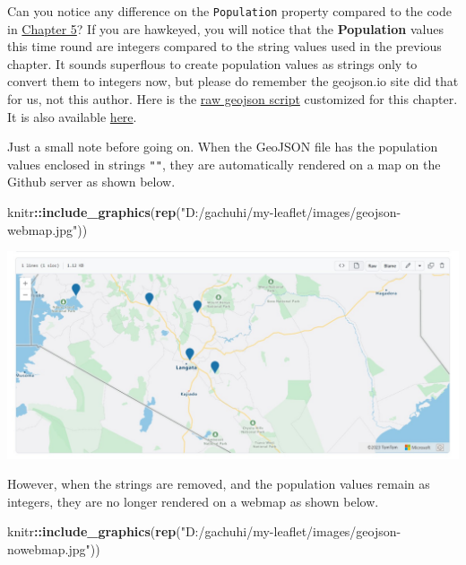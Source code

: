 \documentclass[
]{book}
\newenvironment{Shaded}{\begin{snugshade}}{\end{snugshade}}
\newcommand{\FunctionTok}[1]{\textcolor[rgb]{0.13,0.29,0.53}{\textbf{#1}}}
\newcommand{\NormalTok}[1]{#1}
\newcommand{\SpecialCharTok}[1]{\textcolor[rgb]{0.81,0.36,0.00}{\textbf{#1}}}
\newcommand{\StringTok}[1]{\textcolor[rgb]{0.31,0.60,0.02}{#1}}
\begin{document}
Can you notice any difference on the \texttt{Population} property compared to the code in \protect\hyperlink{using-geojson-in-leaflet}{Chapter 5}? If you are hawkeyed, you will notice that the \textbf{Population} values this time round are integers compared to the string values used in the previous chapter. It sounds superflous to create population values as strings only to convert them to integers now, but please do remember the geojson.io site did that for us, not this author. Here is the \href{https://raw.githubusercontent.com/sammigachuhi/geojson_files/main/cities-geojson2.geojson.txt}{raw geojson script} customized for this chapter. It is also available \href{https://raw.githubusercontent.com/sammigachuhi/my-leaflet-project/main/geojson_files_updated/cities-geojson2.geojson.txt}{here}.

Just a small note before going on. When the GeoJSON file has the population values enclosed in strings \texttt{""}, they are automatically rendered on a map on the Github server as shown below.

\begin{Shaded}
\begin{Highlighting}[]
\NormalTok{knitr}\SpecialCharTok{::}\FunctionTok{include\_graphics}\NormalTok{(}\FunctionTok{rep}\NormalTok{(}\StringTok{"D:/gachuhi/my{-}leaflet/images/geojson{-}webmap.jpg"}\NormalTok{))}
\end{Highlighting}
\end{Shaded}

\includegraphics{../images/geojson-webmap.jpg}

However, when the strings are removed, and the population values remain as integers, they are no longer rendered on a webmap as shown below.

\begin{Shaded}
\begin{Highlighting}[]
\NormalTok{knitr}\SpecialCharTok{::}\FunctionTok{include\_graphics}\NormalTok{(}\FunctionTok{rep}\NormalTok{(}\StringTok{"D:/gachuhi/my{-}leaflet/images/geojson{-}nowebmap.jpg"}\NormalTok{))}
\end{Highlighting}
\end{Shaded}
\end{document}
